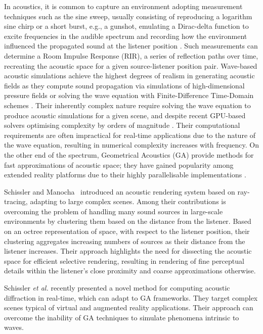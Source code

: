 In acoustics, it is common to capture an environment adopting measurement techniques such as the sine sweep, usually consisting of reproducing a logarithm sine chirp or a short burst, e.g., a gunshot,  emulating a Dirac-delta function to excite frequencies in the audible spectrum and recording how the environment influenced the propagated sound at the listener position \cite{reilly1995convolution}. Such measurements can determine a Room Impulse Response (RIR), a series of reflection paths over time, recreating the acoustic space for a given source-listener position pair. Wave-based acoustic simulations achieve the highest degrees of realism in generating acoustic fields as they compute sound propagation via simulations of high-dimensional pressure fields \cite{raghuvanshi2014parametric} or solving the wave equation with Finite-Difference Time-Domain schemes \cite{hamilton2017fdtd}. Their inherently complex nature require solving the wave equation to produce acoustic simulations for a given scene, and despite recent GPU-based solvers optimising complexity by orders of magnitude \cite{mehra2012efficient}. Their computational requirements are often impractical for real-time applications due to the nature of the wave equation, resulting in numerical complexity increases with frequency. On the other end of the spectrum, Geometrical Acoustics (GA) provide methods for fast approximations of acoustic space; they have gained popularity among extended reality platforms due to their highly parallelisable implementations \cite{savioja2015overview}.\par
Schissler and Manocha~\cite{schissler2016interactive} introduced an acoustic rendering system based on ray-tracing, adapting to large complex scenes. Among their contributions is overcoming the problem of handling many sound sources in large-scale environments by clustering them based on the distance from the listener. Based on an octree representation of space, with respect to the listener position, their clustering aggregates increasing numbers of sources as their distance from the listener increases. Their approach highlights the need for dissecting the acoustic space for efficient selective rendering, resulting in rendering of fine perceptual details within the listener's close proximity and coarse approximations otherwise.\par

Schissler \textit{et al.} \cite{schissler2021fast} recently presented a novel method for computing acoustic diffraction in real-time, which can adapt to GA frameworks. They target complex scenes typical of virtual and augmented reality applications. Their approach can overcome the inability of GA techniques to simulate phenomena intrinsic to waves.\par

